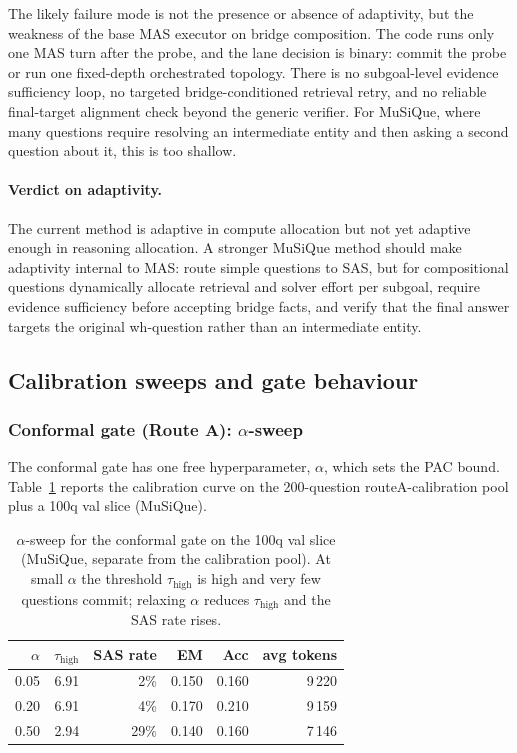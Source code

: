 \documentclass[11pt]{article}
\newcommand{\sas}{SAS\xspace}
\newcommand{\mas}{MAS\xspace}
\begin{document}
The likely failure mode is not the presence or absence of adaptivity, but
the weakness of the base \mas executor on bridge composition. The code runs
only one \mas turn after the probe, and the lane decision is binary:
commit the probe or run one fixed-depth orchestrated topology. There is no
subgoal-level evidence sufficiency loop, no targeted bridge-conditioned
retrieval retry, and no reliable final-target alignment check beyond the
generic verifier. For MuSiQue, where many questions require resolving an
intermediate entity and then asking a second question about it, this is too
shallow.

\paragraph{Verdict on adaptivity.}
The current method is adaptive in compute allocation but not yet adaptive
enough in reasoning allocation. A stronger MuSiQue method should make
adaptivity internal to \mas: route simple questions to \sas, but for
compositional questions dynamically allocate retrieval and solver effort per
subgoal, require evidence sufficiency before accepting bridge facts, and
verify that the final answer targets the original wh-question rather than an
intermediate entity.

\subsection{Calibration sweeps and gate behaviour}

\subsubsection{Conformal gate (Route A): $\alpha$-sweep}

The conformal gate has one free hyperparameter, $\alpha$, which sets the
PAC bound. Table~\ref{tab:alphasweep} reports the calibration curve on the
200-question routeA-calibration pool plus a 100q val slice (MuSiQue).

\begin{table}[H]
\centering
\small
\begin{tabular}{rrrrrr}
\toprule
$\alpha$ & $\tau_{\text{high}}$ & SAS rate & EM & Acc & avg tokens \\
\midrule
0.05 & 6.91 &  2\% & 0.150 & 0.160 & 9\,220 \\
0.20 & 6.91 &  4\% & 0.170 & 0.210 & 9\,159 \\
0.50 & 2.94 & 29\% & 0.140 & 0.160 & 7\,146 \\
\bottomrule
\end{tabular}
\caption{$\alpha$-sweep for the conformal gate on the 100q val slice
(MuSiQue, separate from the calibration pool). At small $\alpha$ the
threshold $\tau_{\text{high}}$ is high and very few questions commit;
relaxing $\alpha$ reduces $\tau_{\text{high}}$ and the SAS rate rises.}
\label{tab:alphasweep}
\end{table}
\end{document}
